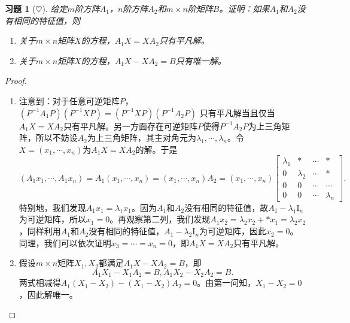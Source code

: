 \documentclass[UTF8]{ctexart}
\newtheorem{ex}[thm]{习题}
\begin{document}
\begin{ex}[$\heartsuit $]
给定$m$阶方阵$A_1$，$n$阶方阵$A_2$和$m \times n$阶矩阵$B$。证明：如果$A_1$和$A_2$没有相同的特征值，则
\begin{enumerate}
\item
关于$m \times n$矩阵$X$的方程，$A_1X = XA_2$只有平凡解。
\item
关于$m \times n$矩阵$X$的方程，$A_1X - XA_2 = B$只有唯一解。
\end{enumerate}
\end{ex}
\begin{proof}
\begin{enumerate}
\item
注意到：对于任意可逆矩阵$P$，$(P^{-1}A_1P)(P^{-1}XP) = (P^{-1}XP)(P^{-1}A_2P)$
只有平凡解当且仅当$A_1X = XA_2$只有平凡解。另一方面存在可逆矩阵$P$使得$P^{-1}A_2P$为上三角矩阵，所以不妨设$A_2$为上三角矩阵，其主对角元为$\lambda_1, \cdots, \lambda_n$。令$X = (x_1, \cdots, x_n)$为$A_1X = XA_2$的解。于是
\[
(A_1x_1, \cdots, A_1x_n) = A_1(x_1, \cdots, x_n) = (x_1, \cdots, x_n) A_2 =  (x_1, \cdots, x_n) \begin{bmatrix}
\lambda_1 & * & \cdots & * \\
0 & \lambda_2 & \cdots & * \\
0 & 0 & \cdots & \cdots \\
0 & 0 &  \cdots & \lambda_n
\end{bmatrix}.
\]
特别地，我们发现$A_1x_1 = \lambda_1 x_1$。因为$A_1$和$A_2$没有相同的特征值，故$A_1 - \lambda_1 \mathrm{I}_n$为可逆矩阵，所以$x_1 = 0$。再观察第二列，我们发现$A_1x_2 = \lambda_2 x_2 + * x_1 = \lambda_2 x_2$，同样利用$A_1$和$A_2$没有相同的特征值，$A_1 - \lambda_2 \mathrm{I}_n$为可逆矩阵，因此$x_2 = 0$。同理，我们可以依次证明$x_3 = \cdots = x_n = 0$，即$A_1X = XA_2$只有平凡解。
\item
假设$m \times n$矩阵$X_1, X_2$都满足$A_1X - XA_2 = B$，即
\[
A_1X_1 - X_1A_2 = B, A_1X_2 - X_2A_2 = B. 
\]
两式相减得$A_1(X_1-X_2) - (X_1-X_2)A_2 = 0$。由第一问知，$X_1-X_2 = 0$，因此解唯一。

\end{enumerate}
\end{proof}
\clearpage
\listofchanges
\end{document}

